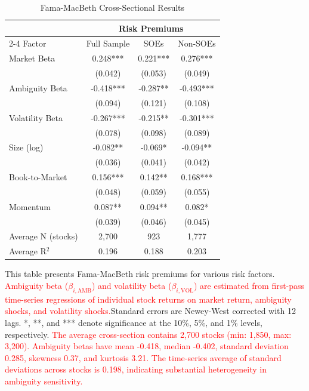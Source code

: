\documentclass[preprint,12pt,authoryear]{elsarticle}
\begin{document}
\begin{table}[htbp]
\centering
\caption{Fama-MacBeth Cross-Sectional Results}
\label{tab:fama_macbeth}
\begin{threeparttable}
\begin{tabular*}{\textwidth}{@{\extracolsep{\fill}} lccc @{\extracolsep{\fill}}}
\toprule
& \multicolumn{3}{c}{Risk Premiums} \\
\cmidrule(lr){2-4}
Factor & Full Sample & SOEs & Non-SOEs \\
\midrule
\midrule
Market Beta & 0.248*** & 0.221*** & 0.276*** \\
& (0.042) & (0.053) & (0.049) \\
Ambiguity Beta & -0.418*** & -0.287** & -0.493*** \\
& (0.094) & (0.121) & (0.108) \\
Volatility Beta & -0.267*** & -0.215** & -0.301*** \\
& (0.078) & (0.098) & (0.089) \\
Size (log) & -0.082** & -0.069* & -0.094** \\
& (0.036) & (0.041) & (0.042) \\
Book-to-Market & 0.156*** & 0.142** & 0.168*** \\
& (0.048) & (0.059) & (0.055) \\
Momentum & 0.087** & 0.094** & 0.082* \\
& (0.039) & (0.046) & (0.045) \\
\midrule
Average N (stocks) & 2,700 & 923 & 1,777 \\
Average R$^2$ & 0.196 & 0.188 & 0.203 \\
\bottomrule
\end{tabular*}
\begin{tablenotes}[flushleft]
\small
\item[] This table presents Fama-MacBeth risk premiums for various risk factors. \textcolor{red}{Ambiguity beta ($\beta_{i,\text{AMB}}$) and volatility beta ($\beta_{i,\text{VOL}}$) are estimated from first-pass time-series regressions of individual stock returns on market return, ambiguity shocks, and volatility shocks.}Standard errors are Newey-West corrected with 12 lags. *, **, and *** denote significance at the 10\%, 5\%, and 1\% levels, respectively. \textcolor{red}{The average cross-section contains 2,700 stocks (min: 1,850, max: 3,200). Ambiguity betas have mean -0.418, median -0.402, standard deviation 0.285, skewness 0.37, and kurtosis 3.21. The time-series average of standard deviations across stocks is 0.198, indicating substantial heterogeneity in ambiguity sensitivity.}
\end{tablenotes}
\end{threeparttable}
\end{table}
\end{document}
